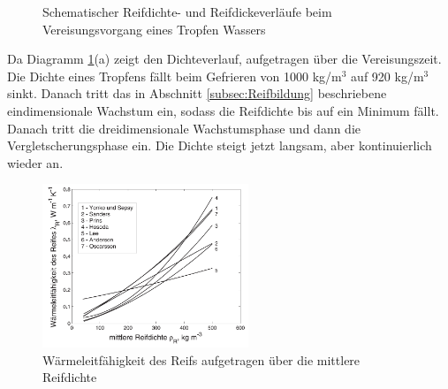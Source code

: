 \begin{figure}
\centering
\caption{Schematischer Reifdichte- und Reifdickeverläufe beim Vereisungsvorgang eines Tropfen Wassers \cite{Schydlo2010}}
\label{fig:Zeitverlaufe von Reifdichte und -dicke}
\end{figure}

Da Diagramm \ref{fig:Zeitverlaufe von Reifdichte und -dicke}(a) zeigt den Dichteverlauf, aufgetragen über die Vereisungszeit. Die Dichte eines Tropfens fällt beim Gefrieren von 1000 kg/m$^3$ auf 920 kg/m$^3$ sinkt. Danach tritt das in Abschnitt \ref{subsec:Reifbildung} beschriebene eindimensionale Wachstum ein, sodass die Reifdichte bis auf ein Minimum fällt. Danach tritt die dreidimensionale Wachstumsphase und dann die Vergletscherungsphase ein. Die Dichte  steigt jetzt langsam, aber kontinuierlich wieder an.

\begin{figure}[htb]
\centering	
\includegraphics[width=0.55\textwidth]{Pictures/Waermeleitfaehigkeit_Schydlo.png}
\caption{Wärmeleitfähigkeit des Reifs aufgetragen über die mittlere Reifdichte \citep{Schydlo2010}}
\label{fig:Waermeleitfaehigkeit}
\end{figure}

